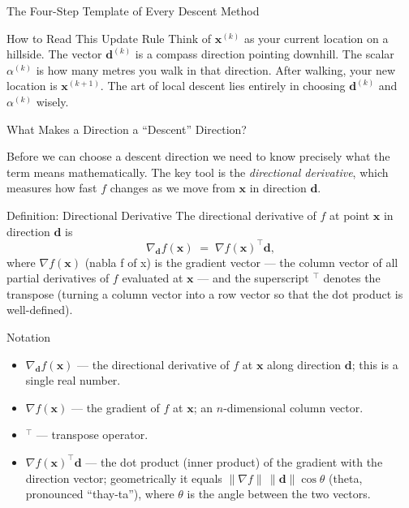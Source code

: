 \documentclass[aspectratio=169,10pt]{beamer}
\newcommand{\bx}{\mathbf{x}}
\newcommand{\bd}{\mathbf{d}}
\newcommand{\grad}{\nabla}
\begin{document}
\begin{frame}[allowframebreaks]{The Four-Step Template of Every Descent Method}
  \begin{alertblock}{How to Read This Update Rule}
    Think of $\bx^{(k)}$ as your current location on a hillside.  The
    vector $\bd^{(k)}$ is a compass direction pointing downhill.  The
    scalar $\alpha^{(k)}$ is how many metres you walk in that direction.
    After walking, your new location is $\bx^{(k+1)}$.  The art of
    local descent lies entirely in choosing $\bd^{(k)}$ and $\alpha^{(k)}$
    wisely.
  \end{alertblock}

\end{frame}

\begin{frame}[allowframebreaks]{What Makes a Direction a ``Descent'' Direction?}

  Before we can choose a descent direction we need to know precisely what
  the term means mathematically.  The key tool is the \emph{directional
  derivative}, which measures how fast $f$ changes as we move from
  $\bx$ in direction $\bd$.

  \begin{block}{Definition: Directional Derivative}
    The directional derivative of $f$ at point $\bx$ in direction $\bd$ is
    \[
      \nabla_{\bd} f(\bx) \;=\; \grad f(\bx)^{\top}\bd,
    \]
    where $\grad f(\bx)$ (nabla f of x) is the gradient vector --- the
    column vector of all partial derivatives of $f$ evaluated at $\bx$ ---
    and the superscript ${}^\top$ denotes the transpose (turning a column
    vector into a row vector so that the dot product is well-defined).
  \end{block}

  \begin{block}{Notation}
    \begin{itemize}
      \item $\nabla_{\bd} f(\bx)$ --- the directional derivative of $f$ at
            $\bx$ along direction $\bd$; this is a single real number.
      \item $\grad f(\bx)$ --- the gradient of $f$ at $\bx$; an
            $n$-dimensional column vector.
      \item ${}^\top$ --- transpose operator.
      \item $\grad f(\bx)^{\top}\bd$ --- the dot product (inner product)
            of the gradient with the direction vector; geometrically it
            equals $\|\grad f\|\,\|\bd\|\cos\theta$ (theta, pronounced
            ``thay-ta''), where $\theta$ is the angle between the two
            vectors.
    \end{itemize}
  \end{block}


\end{frame}
\end{document}
